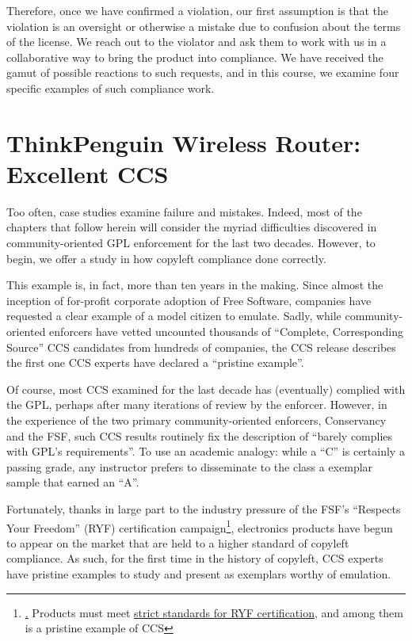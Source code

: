 Therefore, once we have confirmed a violation, our first assumption is
that the violation is an oversight or otherwise a mistake due to confusion
about the terms of the license. We reach out to the violator and ask them
to work with us in a collaborative way to bring the product into
compliance. We have received the gamut of possible reactions to such
requests, and in this course, we examine four specific examples of such
compliance work.

\chapter{ThinkPenguin Wireless Router: Excellent CCS}

Too often, case studies examine failure and mistakes.  Indeed, most of the
chapters that follow herein will consider the myriad difficulties discovered
in community-oriented GPL enforcement for the last two decades.  However, to
begin, we offer a study in how copyleft compliance done correctly.

This example is, in fact, more than ten years in the making.  Since almost
the inception of for-profit corporate adoption of Free Software, companies
have requested a clear example of a model citizen to emulate.  Sadly, while
community-oriented enforcers have vetted uncounted thousands of ``Complete,
Corresponding Source'' CCS candidates from hundreds of companies, the CCS
release describes the first one CCS experts have declared a ``pristine
example''.


Of course, most CCS examined for the last decade has (eventually) complied
with the GPL, perhaps after many iterations of review by the enforcer.
However, in the experience of the two primary community-oriented enforcers,
Conservancy and the FSF, such CCS results routinely fix the description of
``barely complies with GPL's requirements''.  To use an academic analogy:
while a ``C'' is certainly a passing grade, any instructor prefers to
disseminate to the class a exemplar sample that earned an ``A''.

Fortunately, thanks in large part to the industry pressure of the FSF's
``Respects Your Freedom'' (RYF) certification campaign\footnote{\href{RYF is
    a campaign by FSF to certify products that truly meet the principles of
    software freedom}.  Products must meet
  \href{http://www.fsf.org/resources/hw/endorsement/criteria}{strict
    standards for RYF certification}, and among them is a pristine example of
  CCS\@}, electronics products have begun to appear on the market that are
held to a higher standard of copyleft compliance.  As such, for the first
time in the history of copyleft, CCS experts have pristine examples to study
and present as exemplars worthy of emulation.

